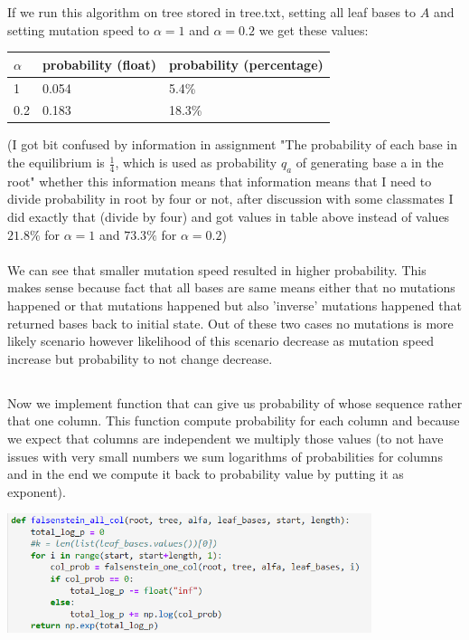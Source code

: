 \documentclass[a4paper]{article}
\begin{document}
	If we run this algorithm on tree stored in tree.txt, setting all leaf bases to $A$ and setting mutation speed to $\alpha = 1$ and $\alpha = 0.2$ we get these values:

	\begin{table}[!h]
		\begin{tabular}{|l|l|l|}
			\hline
			$\alpha$ & probability (float) & probability (percentage)\\ \hline
			1 & 0.054 & 5.4\% \\ \hline
			0.2 & 0.183 & 18.3\% \\ \hline
		\end{tabular}
	\end{table}
	(I got bit confused by information in assignment "The probability of each base in the equilibrium is $\frac{1}{4}$, which is used as probability $q_a$ of generating base a in the root" whether this information means that information means that I need to divide probability in root by four or not, after discussion with some classmates I did exactly that (divide by four) and got values in table above instead of values $21.8\%$ for $\alpha=1$ and $73.3\%$ for $\alpha=0.2$)
	\\
	\\
	We can see that smaller mutation speed resulted in higher probability. This makes sense because fact that all bases are same means either that no mutations happened or that mutations happened but also 'inverse' mutations happened that returned bases back to initial state. Out of these two cases no mutations is more likely scenario however likelihood of this scenario decrease as mutation speed increase but probability to not change decrease.
	
	\subsection{}
	
	Now we implement function that can give us probability of whose sequence rather that one column. This function compute probability for each column and because we expect that columns are independent we multiply those values (to not have issues with very small numbers we sum logarithms of probabilities for columns and in the end we compute it back to probability value by putting it as exponent).
	
	\centerline{\includegraphics[width=0.8\textwidth]{falsenstein_2}} 
	
\end{document}
